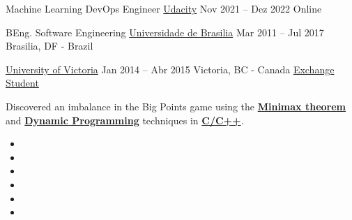 \par
{}

\cveducation
{\normalsize Machine Learning DevOps Engineer}
{\href{https://confirm.udacity.com/VWERCDCT}{Udacity}}
{Nov 2021 -- Dez 2022}
{Online}
{}

\bigskip

\cveducation
{\normalsize BEng. Software Engineering}
{\href{https://fga.unb.br/software}{Universidade de Brasilia}}
{Mar 2011 -- Jul 2017}
{Brasilia, DF - Brazil}
{}

\smallskip

\cveducation
{}
{\href{https://www.uvic.ca/}{University of Victoria}}
{Jan 2014 -- Abr 2015}
{Victoria, BC - Canada}
{\href{http://www.cienciasemfronteiras.gov.br/web/csf/o-programa}{Exchange Student}}
\smallskip


\bigskip



{\smallskip\justifying
{\color{description}
Discovered an imbalance in the Big Points game
using the {\bfseries\color{tech}\href{https://en.wikipedia.org/wiki/Minimax_theorem}{Minimax theorem}}
and {\bfseries\color{tech}\href{https://en.wikipedia.org/wiki/Dynamic_programming}{Dynamic Programming}}
techniques in {\bfseries\color{tech}\href{https://www.cplusplus.com/}{C/C++}}.}
\par}

\bigskip


\begin{itemize}
\item[\scriptsize\color{midaccent}\faComments] 
\item[\scriptsize\color{midaccent}\faComments] \par
\divider
\item[\scriptsize\color{midaccent}\faCode] 
\item[\scriptsize\color{midaccent}\faCode] 
\item[\scriptsize\color{midaccent}\faCode] 
\item[\scriptsize\color{midaccent}\faCode] \par
\end{itemize}


